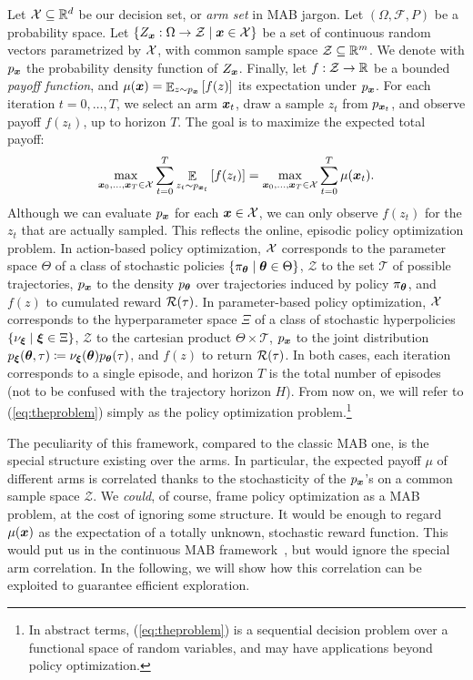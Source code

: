 \documentclass{article}
\begin{document}
Let $\mathcal{X}\subseteq \mathbb{R}^d$ be our decision set, or \textit{arm set} in MAB jargon. Let $(\Omega,\mathcal{F},P)$ be a probability space. Let ${\{Z_{\boldsymbol{x}}:\Omega\to\mathcal{Z}\mid \boldsymbol{x}\in\mathcal{X}\}}$ be a set of continuous random vectors parametrized by $\mathcal{X}$, with common sample space ${\mathcal{Z}\subseteq \mathbb{R}^m}$. We denote with $p_{\boldsymbol{x}}$ the probability density function of $Z_{\boldsymbol{x}}$. Finally, let $f:\mathcal{Z}\to\mathbb{R}$ be a bounded \textit{payoff function}, and $\mu(\boldsymbol{x}) = \mathop{\mathbb{E}}_{z\sim p_{\boldsymbol{x}}}\left[f(z)\right]$ its expectation under $p_{\boldsymbol{x}}$. For each iteration $t=0,\dots,T$, we select an arm $\boldsymbol{x}_t$, draw a sample $z_t$ from $p_{\boldsymbol{x}_t}$, and observe payoff $f(z_t)$, up to horizon $T$. The goal is to maximize the expected total payoff:
\begin{align}\label{eq:theproblem}
\max_{\boldsymbol{x}_0,\dots,\boldsymbol{x}_T\in\mathcal{X}} \sum_{t=0}^T \mathop{\mathbb{E}}_{z_t\sim p_{\boldsymbol{x}_t}}\left[ f(z_t)\right] =  \max_{\boldsymbol{x}_0,\dots,\boldsymbol{x}_T\in\mathcal{X}}\sum_{t=0}^{T}\mu(\boldsymbol{x}_t).
\end{align}
Although we can evaluate $p_{\boldsymbol{x}}$ for each $\boldsymbol{x}\in\mathcal{X}$, we can only observe $f(z_t)$ for the $z_t$ that are actually sampled. 
This reflects the online, episodic policy optimization problem.
In action-based policy optimization, $\mathcal{X}$ corresponds to the parameter space $\Theta$ of a class of stochastic policies ${\{\pi_{\boldsymbol{\theta}}\mid\boldsymbol{\theta}\in\Theta\}}$, $\mathcal{Z}$ to the set $\mathcal{T}$ of possible trajectories, $p_{\boldsymbol{x}}$ to the density $p_{\boldsymbol{\theta}}$ over trajectories induced by policy $\pi_{\boldsymbol{\theta}}$, and $f(z)$ to cumulated reward $\mathcal{R}(\tau)$. 
In parameter-based policy optimization, $\mathcal{X}$ corresponds to the hyperparameter space $\Xi$ of a class of stochastic hyperpolicies $\{\nu_{\boldsymbol{\xi}}\mid\boldsymbol{\xi}\in\Xi\}$, $\mathcal{Z}$ to the cartesian product $\Theta\times\mathcal{T}$, $p_{\boldsymbol{x}}$ to the joint distribution $p_{\boldsymbol{\xi}}(\boldsymbol{\theta},\tau)\coloneqq \nu_{\boldsymbol{\xi}}(\boldsymbol{\theta})p_{\boldsymbol{\theta}}(\tau)$, and $f(z)$ to return $\mathcal{R}(\tau)$. In both cases, each iteration corresponds to a single episode, and horizon $T$ is the total number of episodes (not to be confused with the trajectory horizon $H$). From now on, we will refer to (\ref{eq:theproblem}) simply as the policy optimization problem.\footnote{ In abstract terms, (\ref{eq:theproblem}) is a sequential decision problem over a functional space of random variables, and may have applications beyond policy optimization.}

The peculiarity of this framework, compared to the classic MAB one, is the special structure existing over the arms. In particular, the expected payoff $\mu$ of different arms is correlated thanks to the stochasticity of the $p_{\boldsymbol{x}}$'s on a common sample space $\mathcal{Z}$.
We \textit{could}, of course, frame policy optimization as a MAB problem, at the cost of ignoring some structure. It would be enough to regard $\mu(\boldsymbol{x})$ as the expectation of a totally unknown, stochastic reward function. This would put us in the continuous MAB framework~\citep{kleinberg2013bandits}, but would ignore the special arm correlation. In the following, we will show how this correlation can be exploited to guarantee efficient exploration.
\end{document}
